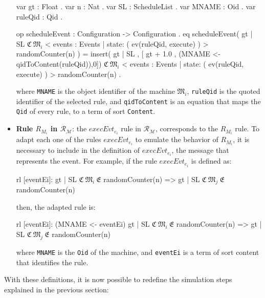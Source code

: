 \begin{itemize}
\begin{maude}
var gt : Float .
var n : Nat .
var SL : ScheduleList .
var MNAME : Oid .
var ruleQid : Qid .
 
op scheduleEvent : Configuration -> Configuration .
eq scheduleEvent( { gt | SL } 
                  {$\mathfrak{C} \ \mathfrak{M}_{i} $ 
                  < events  : Events  | state: ( ev(ruleQid, execute) ) > 
                  randomCounter(n)} )
                 =
                  insert({ gt | SL },
                         [ gt + 1.0 , (MNAME <- qidToContent(ruleQid)),0]) 
                  {$\mathfrak{C} \ \mathfrak{M}_{i} $ 
                  < events  : Events  | state: ( ev(ruleQid, execute) ) > 
                  randomCounter(n)} .\end{maude}
    where \texttt{MNAME} is the object identifier of the machine $\mathfrak{M}_{i}$, \texttt{ruleQid} is the quoted identifier of the selected rule, and \texttt{qidToContent} is an equation that maps the \texttt{Qid} of every rule, to a term of sort \texttt{Content}.

    \item \textbf{Rule $R_{M_i}$ in $\mathscr{R}_\mathscr{M}$}: the $execEvt_{e_i}$ rule in $\mathscr{R}_\mathscr{M}$, corresponds to the $R_{M_i}$ rule. To adapt each one of the rules $execEvt_{e_i}$ to emulate the behavior of $R_{M_i}$, it is necessary to include in the definition of $execEvt_{e_i}$, the message that represents the event. For example, if the rule $execEvt_{e_i}$ is defined as:
    \begin{maude}

rl [eventEi]: { gt | SL } $\mathfrak{C} \ \mathfrak{M}_{i}  \ \mathfrak{E}$ randomCounter(n)
              => 
              { gt | SL } $\mathfrak{C} \ \mathfrak{M}_{j}  \ \mathfrak{E}$ randomCounter(n)\end{maude}
    then, the adapted rule is:
    \begin{maude}

rl [eventEi]: (MNAME <- eventEi) { gt | SL } $\mathfrak{C} \ \mathfrak{M}_{i}  \ \mathfrak{E}$ randomCounter(n)
              => 
              { gt | SL } $\mathfrak{C} \ \mathfrak{M}_{j}  \ \mathfrak{E}$ randomCounter(n)\end{maude}
where \texttt{MNAME} is the \texttt{Oid} of the machine, and \texttt{eventEi} is a term of sort content that identifies the rule.
\end{itemize}

With these definitions, it is now possible to redefine the simulation steps explained in the previous section:

